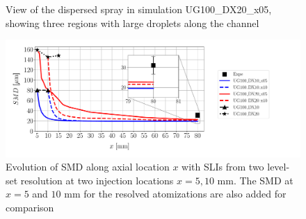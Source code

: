 \begin{figure}[h!]
	\centering	{}
	\caption{View of the dispersed spray in simulation UG100\_DX20\_x05, showing three regions with large droplets along the channel}
	\label{fig:JICF_dx20_large_droplets}
\end{figure}



\vspace*{-0.2in}

\begin{figure}[h!]
\centering
\includegraphics[scale=0.5]{./part2_developments/figures_ch6_lagrangian_JICF/params_resol_and_xInj/SMD_vs_x_LS_resol_and_x_inj}
\vspace*{-0.4in}
\caption[Evolution of SMD along axial location $x$ with SLIs from two level-set resolutions UG100\_DX10, UG100\_DX20 at two injection locations]{Evolution of SMD along axial location $x$ with SLIs from two level-set resolution at two injection locations $x = 5, 10$ mm. The SMD at $x = 5$ and $10$ mm for the resolved atomizations are also added for comparison}
\label{fig:SMD_vs_x_param_LS_resol_and_xinj}
\end{figure}

